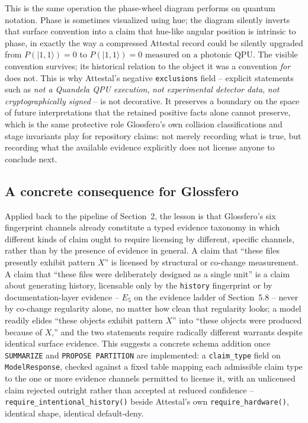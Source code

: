 \documentclass[11pt]{article}
\begin{document}
This is the same operation the phase-wheel diagram performs on quantum notation. Phase is sometimes visualized using hue; the diagram silently inverts that surface convention into a claim that hue-like angular position is intrinsic to phase, in exactly the way a compressed Attestal record could be silently upgraded from $P(|1,1\rangle) = 0$ to $P(|1,1\rangle) = 0 \text{ measured on a photonic QPU}$. The visible convention survives; its historical relation to the object it was a convention \emph{for} does not. This is why Attestal's negative \texttt{exclusions} field -- explicit statements such as \emph{not a Quandela QPU execution}, \emph{not experimental detector data}, \emph{not cryptographically signed} -- is not decorative. It preserves a boundary on the space of future interpretations that the retained positive facts alone cannot preserve, which is the same protective role Glossfero's own collision classifications and stage invariants play for repository claims: not merely recording what is true, but recording what the available evidence explicitly does not license anyone to conclude next.

\subsection{A concrete consequence for Glossfero}

Applied back to the pipeline of Section~2, the lesson is that Glossfero's six fingerprint channels already constitute a typed evidence taxonomy in which different kinds of claim ought to require licensing by different, specific channels, rather than by the presence of evidence in general. A claim that ``these files presently exhibit pattern $X$'' is licensed by structural or co-change measurement. A claim that ``these files were deliberately designed as a single unit'' is a claim about generating history, licensable only by the \texttt{history} fingerprint or by documentation-layer evidence -- $E_5$ on the evidence ladder of Section~5.8 -- never by co-change regularity alone, no matter how clean that regularity looks; a model readily elides ``these objects exhibit pattern $X$'' into ``these objects were produced because of $X$,'' and the two statements require radically different warrants despite identical surface evidence. This suggests a concrete schema addition once \texttt{SUMMARIZE} and \texttt{PROPOSE PARTITION} are implemented: a \texttt{claim\_type} field on \texttt{ModelResponse}, checked against a fixed table mapping each admissible claim type to the one or more evidence channels permitted to license it, with an unlicensed claim rejected outright rather than accepted at reduced confidence -- \texttt{require\_intentional\_history()} beside Attestal's own \texttt{require\_hardware()}, identical shape, identical default-deny.
\end{document}
